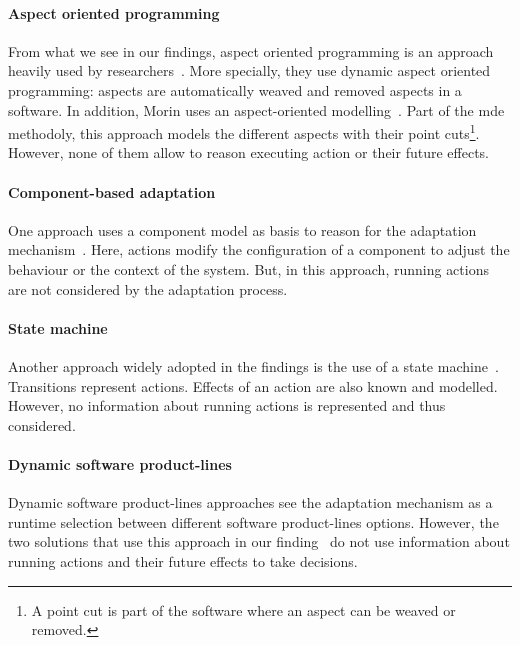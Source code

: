 \paragraph{Aspect oriented programming}
From what we see in our findings, aspect oriented programming is an approach heavily used by researchers~\cite{DBLP:journals/taosd/GreenwoodB06, DBLP:conf/soco/DavidL06, DBLP:conf/icws/CharfiDM09, DBLP:journals/scp/ParraBCD11, DBLP:conf/ewsa/FalcarinA04, DBLP:conf/gpce/PintoFT03}.
More specially, they use dynamic aspect oriented programming: aspects are automatically weaved and removed aspects in a software.
In addition, Morin \etal uses an aspect-oriented modelling~\cite{DBLP:conf/icse/MorinBNJ09}.
Part of the \gls{mde} methodoly, this approach models the different aspects with their point cuts\footnote{A point cut is part of the software where an aspect can be weaved or removed.}.
However, none of them allow to reason executing \gls{action} or their future effects.
	
\paragraph{Component-based adaptation}
One approach uses a component model as basis to reason for the adaptation mechanism~\cite{DBLP:conf/soco/DavidL06}.
Here, \glspl{action} modify the configuration of a component to adjust the behaviour or the context of the system.
But, in this approach, running \glspl{action} are not considered by the adaptation process.

\paragraph{State machine}
Another approach widely adopted in the findings is the use of a state machine~\cite{DBLP:conf/sigsoft/MorenoCGS15, DBLP:conf/kbse/FilieriGLM11,DBLP:conf/wetice/DjoudiBZ14, DBLP:conf/aosd/ZhangGC09, DBLP:conf/icse/GhezziPST13, DBLP:conf/kbse/TajalliGEM10}.
Transitions represent \glspl{action}.
Effects of an action are also known and modelled.
However, no information about running \glspl{action} is represented and thus considered.


\paragraph{Dynamic software product-lines}
Dynamic software product-lines approaches see the adaptation mechanism as a runtime selection between different software product-lines options.
However, the two solutions that use this approach in our finding~\cite{DBLP:conf/dagstuhl/GhezziS10, DBLP:series/lncs/CordyCHLS13} do not use information about running \glspl{action} and their future effects to take decisions.  

